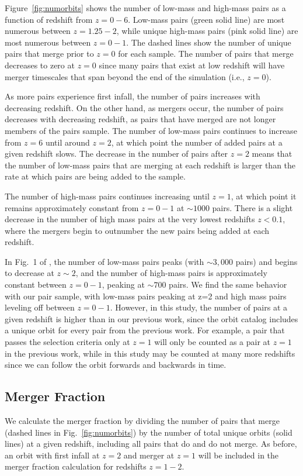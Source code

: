\documentclass[twocolumn,linenumbers]{aastex631}
\newcommand{\chambe}{\citet{Chamberlain2024}}
\begin{document}
Figure~\ref{fig:numorbits} shows the number of low-mass and high-mass pairs as a function of redshift from $z=0-6$. 
Low-mass pairs (green solid line) are most numerous between $z=1.25-2$, while unique high-mass pairs (pink solid line) are most numerous between $z=0-1$.
The dashed lines show the number of unique pairs that merge prior to $z=0$ for each sample. 
The number of pairs that merge decreases to zero at $z=0$ since many pairs that exist at low redshift will have merger timescales that span beyond the end of the simulation (i.e., $z=0$). 

As more pairs experience first infall, the number of pairs increases with decreasing redshift. 
On the other hand, as mergers occur, the number of pairs decreases with decreasing redshift, as pairs that have merged are not longer members of the pairs sample.
The number of low-mass pairs continues to increase from $z=6$ until around $z=2$, at which point the number of added pairs at a given redshift slows. 
The decrease in the number of pairs after $z=2$ means that the number of low-mass pairs that are merging at each redshift is larger than the rate at which pairs are being added to the sample.

The number of high-mass pairs continues increasing until $z=1$, at which point it remains approximately constant from $z=0-1$ at $\sim1000$ pairs. 
There is a slight decrease in the number of high mass pairs at the very lowest redshifts $z<0.1$, where the mergers begin to outnumber the new pairs being added at each redshift.

In Fig.~1 of \chambe{}, the number of low-mass pairs peaks (with $\sim3,000$ pairs) and begins to decrease at $z\sim2$, and the number of high-mass pairs is approximately constant between $z=0-1$, peaking at $\sim700$ pairs. 
We find the same behavior with our pair sample, with low-mass pairs peaking at z=2 and high mass pairs leveling off between $z=0-1$. 
However, in this study, the number of pairs at a given redshift is higher than in our previous work, since the orbit catalog includes a unique orbit for every pair from the previous work.
For example, a pair that passes the \chambe{} selection criteria only at $z=1$ will only be counted as a pair at $z=1$ in the previous work, while in this study may be counted at many more redshifts since we can follow the orbit forwards and backwards in time. 


\subsection{Merger Fraction}
We calculate the merger fraction by dividing the number of pairs that merge (dashed lines in Fig.~\ref{fig:numorbits}) by the number of total unique orbits (solid lines) at a given redshift, including all pairs that do and do not merge. 
As before, an orbit with first infall at $z=2$ and merger at $z=1$ will be included in the merger fraction calculation for redshifts $z=1-2$.
\end{document}
